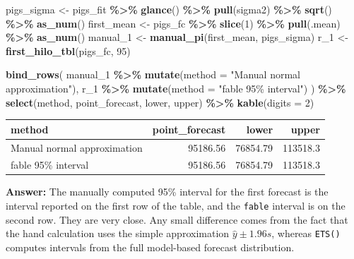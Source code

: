 \documentclass[
  11pt,
]{article}
\newenvironment{Shaded}{\begin{snugshade}}{\end{snugshade}}
\newcommand{\AttributeTok}[1]{\textcolor[rgb]{0.13,0.29,0.53}{#1}}
\newcommand{\DecValTok}[1]{\textcolor[rgb]{0.00,0.00,0.81}{#1}}
\newcommand{\FunctionTok}[1]{\textcolor[rgb]{0.13,0.29,0.53}{\textbf{#1}}}
\newcommand{\NormalTok}[1]{#1}
\newcommand{\OtherTok}[1]{\textcolor[rgb]{0.56,0.35,0.01}{#1}}
\newcommand{\SpecialCharTok}[1]{\textcolor[rgb]{0.81,0.36,0.00}{\textbf{#1}}}
\newcommand{\StringTok}[1]{\textcolor[rgb]{0.31,0.60,0.02}{#1}}
\newcounter{none} %
\begin{document}
\begin{Shaded}
\begin{Highlighting}[]
\NormalTok{pigs\_sigma }\OtherTok{\textless{}{-}}\NormalTok{ pigs\_fit }\SpecialCharTok{\%\textgreater{}\%} \FunctionTok{glance}\NormalTok{() }\SpecialCharTok{\%\textgreater{}\%} \FunctionTok{pull}\NormalTok{(sigma2) }\SpecialCharTok{\%\textgreater{}\%} \FunctionTok{sqrt}\NormalTok{() }\SpecialCharTok{\%\textgreater{}\%} \FunctionTok{as\_num}\NormalTok{()}
\NormalTok{first\_mean }\OtherTok{\textless{}{-}}\NormalTok{ pigs\_fc }\SpecialCharTok{\%\textgreater{}\%} \FunctionTok{slice}\NormalTok{(}\DecValTok{1}\NormalTok{) }\SpecialCharTok{\%\textgreater{}\%} \FunctionTok{pull}\NormalTok{(.mean) }\SpecialCharTok{\%\textgreater{}\%} \FunctionTok{as\_num}\NormalTok{()}
\NormalTok{manual\_1 }\OtherTok{\textless{}{-}} \FunctionTok{manual\_pi}\NormalTok{(first\_mean, pigs\_sigma)}
\NormalTok{r\_1 }\OtherTok{\textless{}{-}} \FunctionTok{first\_hilo\_tbl}\NormalTok{(pigs\_fc, }\DecValTok{95}\NormalTok{)}

\FunctionTok{bind\_rows}\NormalTok{(}
\NormalTok{  manual\_1 }\SpecialCharTok{\%\textgreater{}\%} \FunctionTok{mutate}\NormalTok{(}\AttributeTok{method =} \StringTok{"Manual normal approximation"}\NormalTok{),}
\NormalTok{  r\_1 }\SpecialCharTok{\%\textgreater{}\%} \FunctionTok{mutate}\NormalTok{(}\AttributeTok{method =} \StringTok{"fable 95\% interval"}\NormalTok{)}
\NormalTok{) }\SpecialCharTok{\%\textgreater{}\%}
  \FunctionTok{select}\NormalTok{(method, point\_forecast, lower, upper) }\SpecialCharTok{\%\textgreater{}\%}
  \FunctionTok{kable}\NormalTok{(}\AttributeTok{digits =} \DecValTok{2}\NormalTok{)}
\end{Highlighting}
\end{Shaded}

{\def\LTcaptype{none} %
\begin{longtable}[]{@{}lrrr@{}}
\toprule\noalign{}
method & point\_forecast & lower & upper \\
\midrule\noalign{}
\endhead
\bottomrule\noalign{}
\endlastfoot
Manual normal approximation & 95186.56 & 76854.79 & 113518.3 \\
fable 95\% interval & 95186.56 & 76854.79 & 113518.3 \\
\end{longtable}
}

\textbf{Answer:} The manually computed 95\% interval for the first
forecast is the interval reported on the first row of the table, and the
\texttt{fable} interval is on the second row. They are very close. Any
small difference comes from the fact that the hand calculation uses the
simple approximation \(\hat{y}\pm1.96s\), whereas \texttt{ETS()}
computes intervals from the full model-based forecast distribution.
\end{document}

